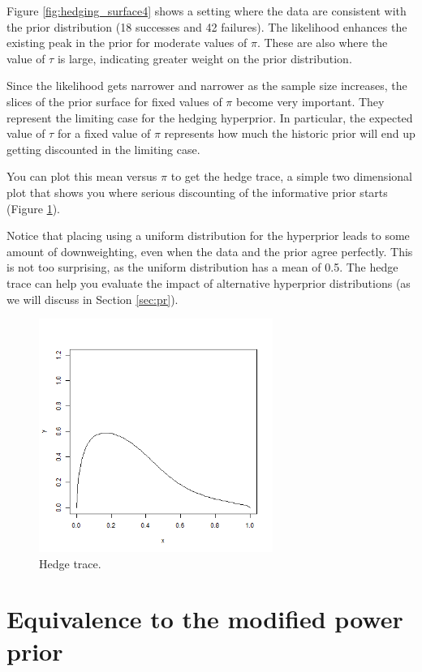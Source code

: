 \documentclass[12pt]{article}
\begin{document}
Figure \ref{fig:hedging_surface4} shows a setting where the data are consistent with the prior distribution (18 successes and 42 failures). The likelihood enhances the existing peak in the prior for moderate values of $\pi$. These are also where the value of $\tau$ is large, indicating greater weight on the prior distribution.

Since the likelihood gets narrower and narrower as the sample size increases, the slices of the prior surface for fixed values of $\pi$ become very important. They represent the limiting case for the hedging hyperprior. In particular, the expected value of $\tau$ for a fixed value of $\pi$ represents how much the historic prior will end up getting discounted in the limiting case. 

You can plot this mean versus $\pi$ to get the hedge trace, a simple two dimensional plot that shows you where serious discounting of the informative prior starts (Figure \ref{fig:hedge_trace}).

Notice that placing using a uniform distribution for the hyperprior leads to some amount of downweighting, even when the data and the prior agree perfectly. This is not too surprising, as the uniform distribution has a mean of 0.5. The hedge trace can help you evaluate the impact of alternative hyperprior distributions (as we will discuss in Section \ref{sec:pr}).

\begin{figure}
\begin{center}
\includegraphics[width=3in]{fig8.png}
\end{center}
\caption{Hedge trace. \label{fig:hedge_trace}}
\end{figure}


\section{Equivalence to the modified power prior}
\label{sec:equiv}
\end{document}
